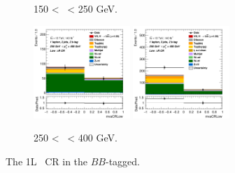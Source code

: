 \begin{figure}[h!]
\begin{subfigure}[b]{\textwidth}
        \caption{150 < \ptv\ < 250 GeV.}
        \label{fig:plots_VHbb_1L_150_CRL}
    \end{subfigure}
    \begin{subfigure}[b]{\textwidth}
        \centering
        \includegraphics[width=0.40\textwidth]{Images/VH/Own_fit/prefit_VHbb/Region_distmvaCRLow_BMax400_BMin250_DCRLow_J2_TTypebb_T2_L1_Y6051_Prefit.png}
        \includegraphics[width=0.40\textwidth]{Images/VH/Own_fit/prefit_VHbb/Region_distmvaCRLow_BMax400_BMin250_DCRLow_J3_TTypebb_T2_L1_Y6051_Prefit.png}
        \caption{250 < \ptv\ < 400 GeV.}
        \label{fig:plots_VHbb_1L_250_CRL}
    \end{subfigure}
    \caption{The 1L \lowdr\ CR in the $BB$-tagged.}
    \label{fig:plots_VHbb_1L_CRL}
\end{figure} 

\vspace*{\fill} \clearpage
\vspace*{\fill}

